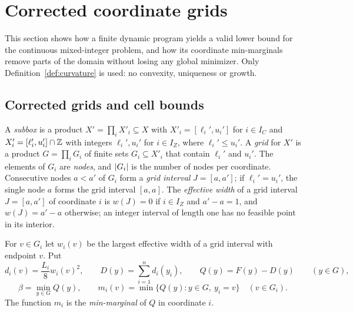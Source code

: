 \section{Corrected coordinate grids}\label{sec:grids}

This section shows how a finite dynamic program yields a valid lower bound
for the continuous mixed-integer problem, and how its coordinate
min-marginals remove parts of the domain without losing any global minimizer.
Only Definition~\ref{def:curvature} is used: no convexity, uniqueness or
growth.

\subsection{Corrected grids and cell bounds}
A \emph{subbox} is a product $X'=\prod_iX'_i\subseteq X$ with
$X'_i=[\ell_i',u_i']$ for $i\in I_C$ and $X'_i=[\ell_i',u_i']\cap\mathbb Z$ with
integers $\ell_i',u_i'$ for $i\in I_Z$, where $\ell_i'\le u_i'$. A \emph{grid} for $X'$ is a product
$G=\prod_iG_i$ of finite sets $G_i\subseteq X'_i$ that contain $\ell_i'$ and
$u_i'$. The elements of $G_i$ are \emph{nodes}, and $\lvert G_i\rvert$ is the number
of nodes per coordinate. Consecutive nodes $a<a'$ of $G_i$ form a
\emph{grid interval} $J=[a,a']$; if $\ell_i'=u_i'$, the single node $a$ forms
the grid interval $[a,a]$. The \emph{effective width} of a grid interval
$J=[a,a']$ of coordinate $i$ is $w(J)=0$ if $i\in I_Z$ and $a'-a=1$, and
$w(J)=a'-a$ otherwise; an integer interval of length one has no feasible point
in its interior.

\begin{definition}\label{def:corr}
For $v\in G_i$ let $w_i(v)$ be the largest effective width of a grid interval
with endpoint $v$. Put
\begin{equation}\label{eq:correction}
d_i(v)=\frac{L_i}{8}w_i(v)^2,\qquad D(y)=\sum_{i=1}^nd_i(y_i),\qquad
Q(y)=F(y)-D(y)\qquad(y\in G),
\end{equation}
\begin{equation}\label{eq:minmarginal}
\beta=\min_{y\in G}Q(y),\qquad m_i(v)=\min\{Q(y):y\in G,\ y_i=v\}\quad(v\in G_i).
\end{equation}
The function $m_i$ is the \emph{min-marginal} of $Q$ in coordinate $i$.
\end{definition}

